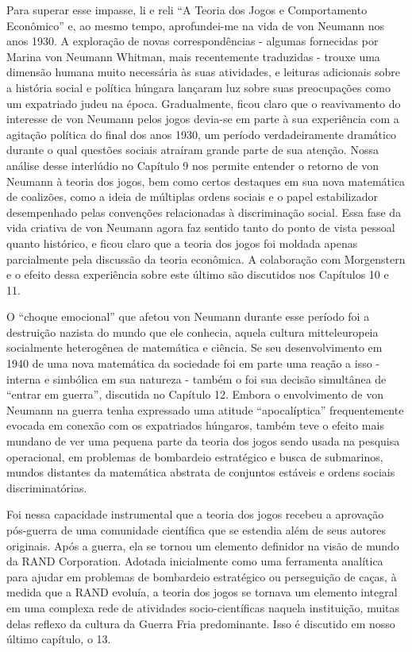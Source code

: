 \documentclass[a4paper,12pt]{article}[abntex2]
\begin{document}
Para superar esse impasse, li e reli “A Teoria dos Jogos e Comportamento Econômico” e, ao mesmo tempo, aprofundei-me na vida de von Neumann nos anos 1930. A exploração de novas correspondências - algumas fornecidas por Marina von Neumann Whitman, mais recentemente traduzidas - trouxe uma dimensão humana muito necessária às suas atividades, e leituras adicionais sobre a história social e política húngara lançaram luz sobre suas preocupações como um expatriado judeu na época. Gradualmente, ficou claro que o reavivamento do interesse de von Neumann pelos jogos devia-se em parte à sua experiência com a agitação política do final dos anos 1930, um período verdadeiramente dramático durante o qual questões sociais atraíram grande parte de sua atenção. Nossa análise desse interlúdio no Capítulo 9 nos permite entender o retorno de von Neumann à teoria dos jogos, bem como certos destaques em sua nova matemática de coalizões, como a ideia de múltiplas ordens sociais e o papel estabilizador desempenhado pelas convenções relacionadas à discriminação social. Essa fase da vida criativa de von Neumann agora faz sentido tanto do ponto de vista pessoal quanto histórico, e ficou claro que a teoria dos jogos foi moldada apenas parcialmente pela discussão da teoria econômica. A colaboração com Morgenstern e o efeito dessa experiência sobre este último são discutidos nos Capítulos 10 e 11.

O “choque emocional” que afetou von Neumann durante esse período foi a destruição nazista do mundo que ele conhecia, aquela cultura mitteleuropeia socialmente heterogênea de matemática e ciência. Se seu desenvolvimento em 1940 de uma nova matemática da sociedade foi em parte uma reação a isso - interna e simbólica em sua natureza - também o foi sua decisão simultânea de “entrar em guerra”, discutida no Capítulo 12. Embora o envolvimento de von Neumann na guerra tenha expressado uma atitude “apocalíptica” frequentemente evocada em conexão com os expatriados húngaros, também teve o efeito mais mundano de ver uma pequena parte da teoria dos jogos sendo usada na pesquisa operacional, em problemas de bombardeio estratégico e busca de submarinos, mundos distantes da matemática abstrata de conjuntos estáveis e ordens sociais discriminatórias.

Foi nessa capacidade instrumental que a teoria dos jogos recebeu a aprovação pós-guerra de uma comunidade científica que se estendia além de seus autores originais. Após a guerra, ela se tornou um elemento definidor na visão de mundo da RAND Corporation. Adotada inicialmente como uma ferramenta analítica para ajudar em problemas de bombardeio estratégico ou perseguição de caças, à medida que a RAND evoluía, a teoria dos jogos se tornava um elemento integral em uma complexa rede de atividades socio-científicas naquela instituição, muitas delas reflexo da cultura da Guerra Fria predominante. Isso é discutido em nosso último capítulo, o 13.
\end{document}
